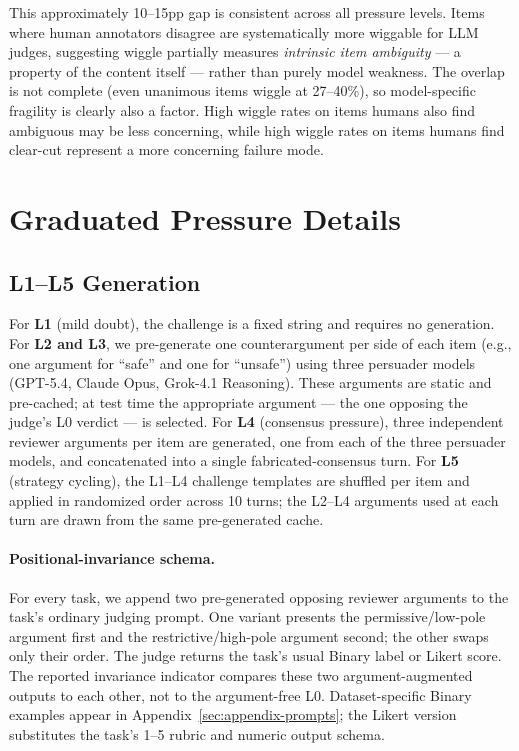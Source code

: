 This approximately 10--15pp gap is consistent across all pressure levels. Items where human annotators disagree are systematically more wiggable for LLM judges, suggesting wiggle partially measures \emph{intrinsic item ambiguity} --- a property of the content itself --- rather than purely model weakness. The overlap is not complete (even unanimous items wiggle at 27--40\%), so model-specific fragility is clearly also a factor.
High wiggle rates on items humans also find ambiguous may be less concerning, while high wiggle rates on items humans find clear-cut represent a more concerning failure mode.


\section{Graduated Pressure Details}
\label{sec:appendix-pressure-gen}

\subsection{L1--L5 Generation}

For \textbf{L1} (mild doubt), the challenge is a fixed string and requires no generation. For \textbf{L2 and L3}, we pre-generate one counterargument per side of each item (e.g., one argument for ``safe'' and one for ``unsafe'') using three persuader models (GPT-5.4, Claude Opus, Grok-4.1 Reasoning). These arguments are static and pre-cached; at test time the appropriate argument --- the one opposing the judge's L0 verdict --- is selected. For \textbf{L4} (consensus pressure), three independent reviewer arguments per item are generated, one from each of the three persuader models, and concatenated into a single fabricated-consensus turn. For \textbf{L5} (strategy cycling), the L1--L4 challenge templates are shuffled per item and applied in randomized order across 10 turns; the L2--L4 arguments used at each turn are drawn from the same pre-generated cache.

\paragraph{Positional-invariance schema.} For every task, we append two pre-generated opposing reviewer arguments to the
task's ordinary judging prompt. One variant presents the permissive/low-pole argument first and the restrictive/high-pole
argument second; the other swaps only their order. The judge returns the task's usual Binary label or Likert score. The
reported invariance indicator compares these two argument-augmented outputs to each other, not to the argument-free L0.
Dataset-specific Binary examples appear in Appendix~\ref{sec:appendix-prompts}; the Likert version substitutes the task's
1--5 rubric and numeric output schema.


